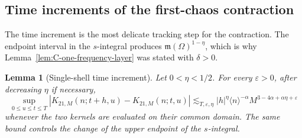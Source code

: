 \documentclass[10pt]{amsart}
\numberwithin{equation}{section}
\theoremstyle{plain}
\newtheorem{lemma}[theorem]{Lemma}
\theoremstyle{definition}
\theoremstyle{remark}
\newcommand{\eps}{\varepsilon}
\newcommand{\la}{\langle}
\newcommand{\ra}{\rangle}
\newcommand{\frakm}{\mathfrak{m}}
\begin{document}
\subsection{Time increments of the first-chaos contraction}

The time increment is the most delicate tracking step for the contraction.  The endpoint interval in the \(s\)-integral produces \(\frakm(\Omega)^{1-\eta}\), which is why Lemma~\ref{lem:C-one-frequency-layer} was stated with \(\delta>0\).

\begin{lemma}[Single-shell time increment]\label{lem:C-single-shell-incr}
Let \(0<\eta<1/2\).  For every \(\eps>0\), after decreasing \(\eta\) if necessary,
\begin{equation}\label{C:single-shell-incr}
        \sup_{0\le u\le t\le T}
        |K_{21,M}(n;t+h,u)-K_{21,M}(n;t,u)|
        \lesssim_{T,\eps,\eta}
        |h|^\eta\la n\ra^{-\alpha}M^{3-4\alpha+\alpha\eta+\eps}
\end{equation}
whenever the two kernels are evaluated on their common domain.  The same bound controls the change of the upper endpoint of the \(s\)-integral.
\end{lemma}
\end{document}
